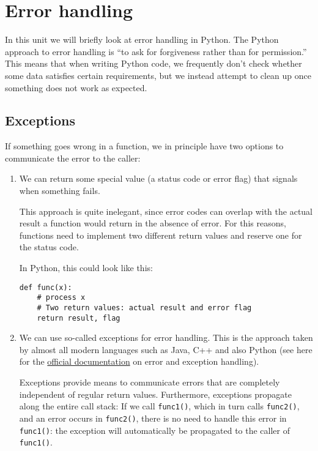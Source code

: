 \documentclass{scrartcl}
\begin{document}
    
    \maketitle
    \tableofcontents
    
    

    
    \hypertarget{error-handling}{%
\section{Error handling}\label{error-handling}}

In this unit we will briefly look at error handling in Python. The
Python approach to error handling is ``to ask for forgiveness rather
than for permission.'' This means that when writing Python code, we
frequently don't check whether some data satisfies certain requirements,
but we instead attempt to clean up once something does not work as
expected.

    \hypertarget{exceptions}{%
\subsection{Exceptions}\label{exceptions}}

If something goes wrong in a function, we in principle have two options
to communicate the error to the caller:

\begin{enumerate}
\def\labelenumi{\arabic{enumi}.}
\item
  We can return some special value (a status code or error flag) that
  signals when something fails.

  This approach is quite inelegant, since error codes can overlap with
  the actual result a function would return in the absence of error. For
  this reasons, functions need to implement two different return values
  and reserve one for the status code.

  In Python, this could look like this:

\begin{verbatim}
def func(x):
    # process x
    # Two return values: actual result and error flag
    return result, flag
\end{verbatim}
\item
  We can use so-called exceptions for error handling. This is the
  approach taken by almost all modern languages such as Java, C++ and
  also Python (see here for the
  \href{https://docs.python.org/3/tutorial/errors.html}{official
  documentation} on error and exception handling).

  Exceptions provide means to communicate errors that are completely
  independent of regular return values. Furthermore, exceptions
  propagate along the entire call stack: If we call \texttt{func1()},
  which in turn calls \texttt{func2()}, and an error occurs in
  \texttt{func2()}, there is no need to handle this error in
  \texttt{func1()}: the exception will automatically be propagated to
  the caller of \texttt{func1()}.
\end{enumerate}
\end{document}

